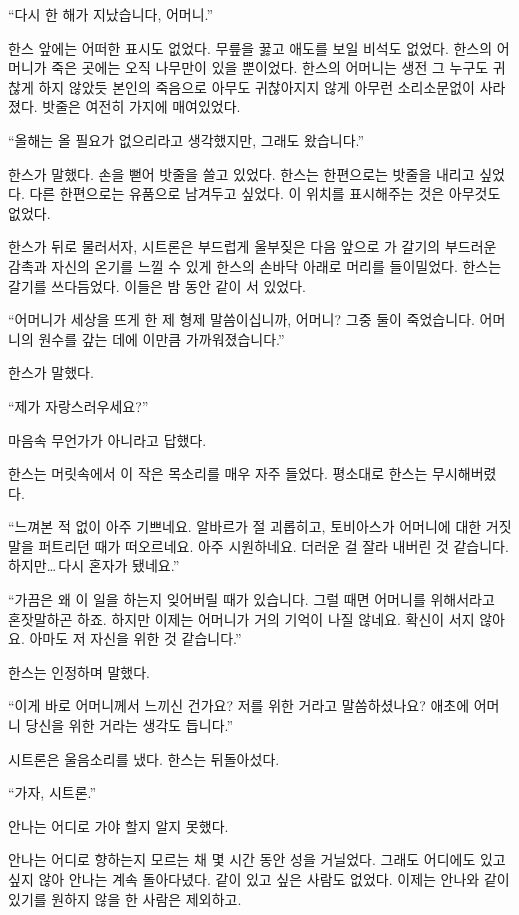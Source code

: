 ``다시 한 해가 지났습니다, 어머니.''

한스 앞에는 어떠한 표시도 없었다. 무릎을 꿇고 애도를 보일 비석도 없었다. 한스의 어머니가 죽은 곳에는 오직 나무만이 있을 뿐이었다. 한스의 어머니는 생전 그 누구도 귀찮게 하지 않았듯 본인의 죽음으로 아무도 귀찮아지지 않게 아무런 소리소문없이 사라졌다. 밧줄은 여전히 가지에 매여있었다.

``올해는 올 필요가 없으리라고 생각했지만, 그래도 왔습니다.''

한스가 말했다. 손을 뻗어 밧줄을 쓸고 있었다. 한스는 한편으로는 밧줄을 내리고 싶었다. 다른 한편으로는 유품으로 남겨두고 싶었다. 이 위치를 표시해주는 것은 아무것도 없었다.

한스가 뒤로 물러서자, 시트론은 부드럽게 울부짖은 다음 앞으로 가 갈기의 부드러운 감촉과 자신의 온기를 느낄 수 있게 한스의 손바닥 아래로 머리를 들이밀었다. 한스는 갈기를 쓰다듬었다. 이들은 밤 동안 같이 서 있었다.

``어머니가 세상을 뜨게 한 제 형제 말씀이십니까, 어머니? 그중 둘이 죽었습니다. 어머니의 원수를 갚는 데에 이만큼 가까워졌습니다.''

한스가 말했다.

``제가 자랑스러우세요?''

마음속 무언가가 아니라고 답했다.

한스는 머릿속에서 이 작은 목소리를 매우 자주 들었다. 평소대로 한스는 무시해버렸다.

`` 느껴본 적 없이 아주 기쁘네요. 알바르가 절 괴롭히고, 토비아스가 어머니에 대한 거짓말을 퍼트리던 때가 떠오르네요. 아주 시원하네요. 더러운 걸 잘라 내버린 것 같습니다. 하지만\ldots\,다시 혼자가 됐네요.''

``가끔은 왜 이 일을 하는지 잊어버릴 때가 있습니다. 그럴 때면 어머니를 위해서라고 혼잣말하곤 하죠. 하지만 이제는 어머니가 거의 기억이 나질 않네요. 확신이 서지 않아요. 아마도 저 자신을 위한 것 같습니다.''

한스는 인정하며 말했다.

``이게 바로 어머니께서 느끼신 건가요? 저를 위한 거라고 말씀하셨나요? 애초에 어머니 당신을 위한 거라는 생각도 듭니다.''

시트론은 울음소리를 냈다. 한스는 뒤돌아섰다.

``가자, 시트론.''

\textbreak

안나는 어디로 가야 할지 알지 못했다.

안나는 어디로 향하는지 모르는 채 몇 시간 동안 성을 거닐었다. 그래도 어디에도 있고 싶지 않아 안나는 계속 돌아다녔다. 같이 있고 싶은 사람도 없었다. 이제는 안나와 같이 있기를 원하지 않을 한 사람은 제외하고.

